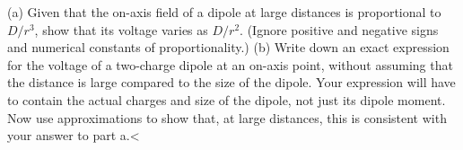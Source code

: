         (a) Given that the on-axis field of a dipole at large distances is proportional to
        $D/r^3$, show that its voltage
        varies as $D/r^2$. (Ignore positive and negative signs and
        numerical constants of proportion\-ality.)\hwendpart
        (b) Write down an exact expression for the voltage of a two-charge dipole at an on-axis point,
        without assuming that the distance is large compared to the size
        of the dipole. Your expression will have to contain the actual
        charges and size of the dipole, not just its dipole moment. Now
        use approximations to show that, at large distances, this is consistent with
        your answer to part a.<%
